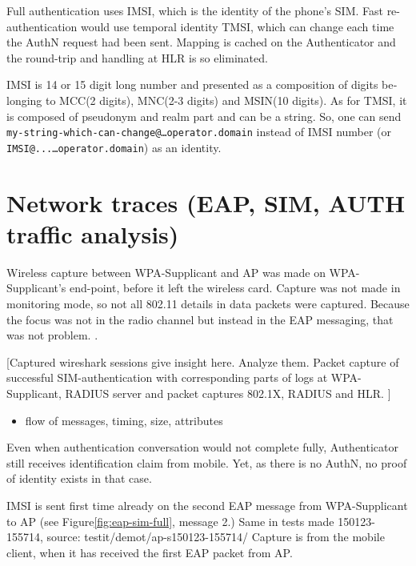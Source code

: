 \documentclass[12pt,a4paper,english]{tutthesis}
\begin{document}
\begin{otherlanguage}{english}
Full authentication uses IMSI, which is the identity of the phone's SIM.
Fast re-authentication would use temporal identity TMSI, which 
can change each time the AuthN request had been sent. Mapping
is cached on the  Authenticator and the round-trip and handling at HLR is
so eliminated. 

IMSI is 14 or 15 digit long number and presented as a composition
of digits belonging to MCC(2 digits), MNC(2-3 digits) and MSIN(10 digits).
As for TMSI, it is composed of pseudonym and realm part and can be a
string. So, one can send 
\texttt{my-string-which-can-change@…operator.domain} instead of 
IMSI number (or \texttt{IMSI@...…operator.domain}) as an identity. 


\section{Network traces (EAP, SIM, AUTH traffic analysis)}
\label{sec-5-4}
Wireless capture between WPA-Supplicant and AP was made on
WPA-Supplicant's end-point, before it left the wireless card. Capture was
not made in monitoring mode, so not all 802.11 details in
data packets were captured.
  Because the focus was not in the
radio channel but instead in the EAP messaging, that was not problem.
 \cite{wireshark-capture}.

[Captured wireshark sessions give insight here. Analyze them.
Packet capture of successful SIM-authentication with corresponding
parts of logs at WPA-Supplicant, RADIUS server and packet captures 
802.1X, RADIUS and HLR. ]

\begin{itemize}
\item flow of messages,  timing,  size, attributes
\end{itemize}

Even when authentication conversation would not complete fully,
Authenticator still receives identification claim from mobile. Yet, as
there is no AuthN, no proof of identity exists in that case.

IMSI is sent first time already on the second EAP message from 
WPA-Supplicant to AP (see Figure\ref{fig:eap-sim-full}, message 2.)
Same in tests made 150123-155714, source:
testit/demot/ap-s150123-155714/
Capture is from the mobile client, when it has received the first EAP
packet from AP.


\end{otherlanguage}
\end{document}
